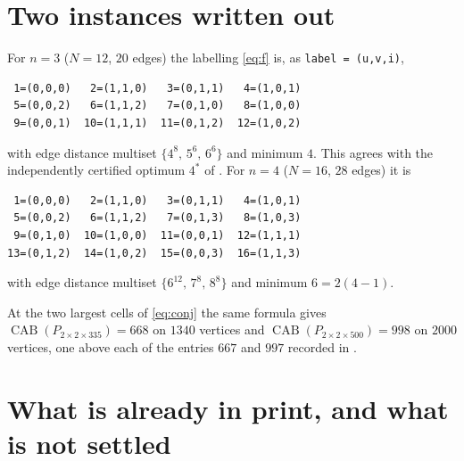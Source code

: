 \documentclass[11pt]{amsart}
\DeclareMathOperator{\CAB}{CAB}
\begin{document}
\section{Two instances written out}

For $n=3$ ($N=12$, $20$ edges) the labelling \eqref{eq:f} is, as \texttt{label = (u,v,i)},
\begin{verbatim}
 1=(0,0,0)   2=(1,1,0)   3=(0,1,1)   4=(1,0,1)
 5=(0,0,2)   6=(1,1,2)   7=(0,1,0)   8=(1,0,0)
 9=(0,0,1)  10=(1,1,1)  11=(0,1,2)  12=(1,0,2)
\end{verbatim}
with edge distance multiset $\{4^{8},\,5^{6},\,6^{6}\}$ and minimum $4$. This agrees with the
independently certified optimum $4^{*}$ of \cite{SAT2026}. For $n=4$ ($N=16$, $28$ edges) it is
\begin{verbatim}
 1=(0,0,0)   2=(1,1,0)   3=(0,1,1)   4=(1,0,1)
 5=(0,0,2)   6=(1,1,2)   7=(0,1,3)   8=(1,0,3)
 9=(0,1,0)  10=(1,0,0)  11=(0,0,1)  12=(1,1,1)
13=(0,1,2)  14=(1,0,2)  15=(0,0,3)  16=(1,1,3)
\end{verbatim}
with edge distance multiset $\{6^{12},\,7^{8},\,8^{8}\}$ and minimum $6 = 2(4-1)$.

At the two largest cells of \eqref{eq:conj} the same formula gives
$\CAB(P_{2\times2\times335}) = 668$ on $1340$ vertices and $\CAB(P_{2\times2\times500}) = 998$ on
$2000$ vertices, one above each of the entries $667$ and $997$ recorded in \cite{Optsicom}.

\section{What is already in print, and what is not settled}\label{sec:print}
\end{document}
